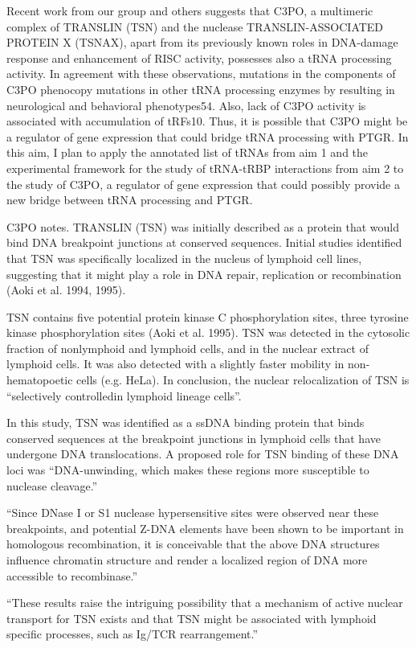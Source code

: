 \documentclass[12pt]{rockefeller}
\begin{document}
Recent work from our group and others suggests that C3PO, a multimeric complex of TRANSLIN (TSN) and the nuclease TRANSLIN-ASSOCIATED PROTEIN X (TSNAX), apart from its previously known roles in DNA-damage response and enhancement of RISC activity, possesses also a tRNA processing activity. In agreement with these observations, mutations in the components of C3PO phenocopy mutations in other tRNA processing enzymes by resulting in neurological and behavioral phenotypes54. Also, lack of C3PO activity is associated with accumulation of tRFs10. Thus, it is possible that C3PO might be a regulator of gene expression that could bridge tRNA processing with PTGR. In this aim, I plan to apply the annotated list of tRNAs from aim 1 and the experimental framework for the study of tRNA-tRBP interactions from aim 2 to the study of C3PO, a regulator of gene expression that could possibly provide a new bridge between tRNA processing and PTGR. 

C3PO notes. TRANSLIN (TSN) was initially described as a protein that would bind DNA breakpoint junctions at conserved sequences. Initial studies identified that TSN was specifically localized in the nucleus of lymphoid cell lines, suggesting that it might play a role in DNA repair, replication or recombination (Aoki et al. 1994, 1995). 

TSN contains five potential protein kinase C phosphorylation sites, three tyrosine kinase phosphorylation sites (Aoki et al. 1995).
TSN was detected in the cytosolic fraction of nonlymphoid and lymphoid cells, and in the nuclear extract of lymphoid cells. It was also detected with a slightly faster mobility in non-hematopoetic cells (e.g. HeLa). 
In conclusion, the nuclear relocalization of TSN is “selectively controlledin lymphoid lineage cells”. 

In this study, TSN was identified as a ssDNA binding protein that binds conserved sequences at the breakpoint junctions in lymphoid cells that have undergone DNA translocations. A proposed role for TSN binding of these DNA loci was “DNA-unwinding, which makes these regions more susceptible to nuclease cleavage.”

“Since DNase I or S1 nuclease hypersensitive sites were observed near these breakpoints, and potential Z-DNA elements have been shown to be important in homologous recombination, it is conceivable that the above DNA structures influence chromatin structure and render a localized region of DNA more accessible to recombinase.”

“These results raise the intriguing possibility that a mechanism of active nuclear transport for TSN exists and that TSN might be associated with lymphoid specific processes, such as Ig/TCR rearrangement.”
\end{document}
